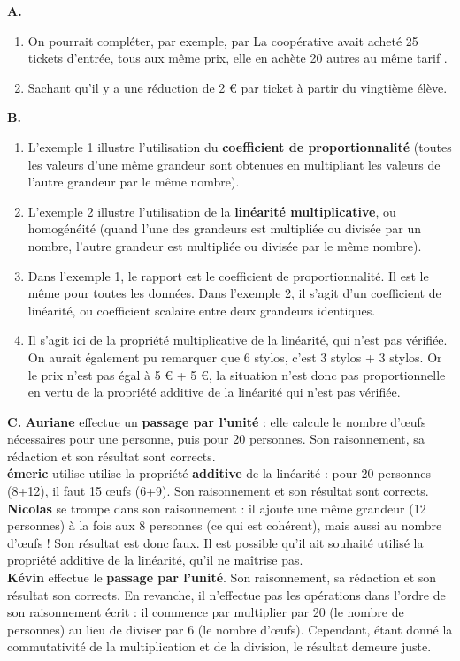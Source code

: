 {\bf A.}
\begin{enumerate}
   \item On pourrait compléter, par exemple, par \og La coopérative avait acheté 25 tickets d'entrée, tous aux même prix, elle en achète 20 autres au même tarif \fg.
   \item \og Sachant qu'il y a une réduction de 2 \euro{} par ticket à partir du vingtième élève. \fg{} \\
\end{enumerate}

{\bf B.}
\begin{enumerate}
   \item L'exemple 1 illustre l'utilisation du {\bf coefficient de proportionnalité} (toutes les valeurs d'une même grandeur sont obtenues en multipliant les valeurs de l'autre grandeur par le même nombre).
   \item L'exemple 2 illustre l'utilisation de la {\bf linéarité multiplicative}, ou homogénéité (quand l'une des grandeurs est multipliée ou divisée par un nombre, l'autre grandeur est multipliée ou divisée par le même nombre).
   \item Dans l'exemple 1, le rapport est le coefficient de proportionnalité. Il est le même pour toutes les données. Dans l'exemple 2, il s'agit d'un coefficient de linéarité, ou coefficient scalaire entre deux grandeurs identiques.
   \item Il s'agit ici de la propriété multiplicative de la linéarité, qui n'est pas vérifiée. \\
   On aurait également pu remarquer que 6 stylos, c'est 3 stylos + 3 stylos. Or le prix n'est pas égal à 5 \euro{} + 5 \euro{}, la situation n'est donc pas proportionnelle en vertu de la propriété additive de la linéarité qui n'est pas vérifiée. \\
\end{enumerate}

{\bf C.} {\bf Auriane} effectue un {\bf passage par l'unité} : elle calcule le nombre d'\oe ufs nécessaires pour une personne, puis pour 20 personnes. Son raisonnement, sa rédaction et son résultat sont corrects. \\
   {\bf émeric} utilise utilise la propriété {\bf additive} de la linéarité : pour 20 personnes (8+12), il faut 15 \oe ufs (6+9). Son raisonnement et son résultat sont corrects. \\
   {\bf Nicolas} se trompe dans son raisonnement : il ajoute une même grandeur (12 personnes) à la fois aux 8 personnes (ce qui est cohérent), mais aussi au nombre d'\oe ufs ! Son résultat est donc faux. Il est possible qu'il ait souhaité utilisé la propriété additive de la linéarité, qu'il ne maîtrise pas. \\
   {\bf Kévin} effectue le {\bf passage par l'unité}. Son raisonnement, sa rédaction et son résultat son corrects. En revanche, il n'effectue pas les opérations dans l'ordre de son raisonnement écrit : il commence par multiplier par 20 (le nombre de personnes) au lieu de diviser par 6 (le nombre d'\oe ufs). Cependant, étant donné la commutativité de la multiplication et de la division, le résultat demeure juste. \\

